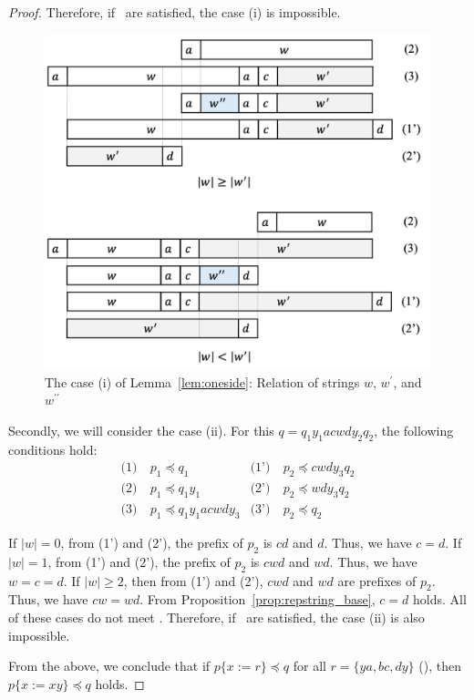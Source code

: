 \begin{proof}
  Therefore, if \TheConditionB\ are satisfied, the case (i) is impossible.

  \begin{figure}[t]
    \begin{center}
      \includegraphics[scale=0.345]{figs/centerproof2.pdf}
      \caption{The case (i) of Lemma~\ref{lem:oneside}: Relation of strings $w$, $w^{\prime}$, and $w^{\prime\prime}$}\label{fig:centerproof2}
    \end{center}
    \end{figure}

Secondly, we will consider the case (ii).
For this $q=q_{1}y_{1}acwdy_{2}q_{2}$, the following conditions hold:
\begin{align*}
  \textrm{(1)}~& p_{1} \preceq q_{1} & \textrm{(1')}~& p_{2} \preceq cwdy_{3}q_{2} \\
  \textrm{(2)}~& p_{1} \preceq q_{1}y_{1} & \textrm{(2')}~& p_{2} \preceq wdy_{3}q_{2} \\
  \textrm{(3)}~& p_{1} \preceq q_{1}y_{1}acwdy_{3} & \textrm{(3')}~& p_{2} \preceq q_{2}
\end{align*}

If $|w|=0$, from (1') and (2'), the prefix of $p_{2}$ is $cd$ and $d$.
Thus, we have $c=d$.
If $|w|=1$, from (1') and (2'), the prefix of $p_{2}$ is $cwd$ and $wd$.
Thus, we have $w=c=d$.
If $|w| \ge 2$, then from (1') and (2'), $cwd$ and $wd$ are prefixes of $p_{2}$.
Thus, we have $cw=wd$.
From Proposition~\ref{prop:repstring_base}, $c=d$ holds.
All of these cases do not meet \TheConditionB.
Therefore, if \TheConditionB\ are satisfied, the case (ii) is also impossible.

From the above, we conclude that if $p \{ x := r \} \preceq q$ for all $r = \{ ya, bc, dy \}$ (\TheConditionB), then $p \{ x := xy \} \preceq q$ holds.
\end{proof}


